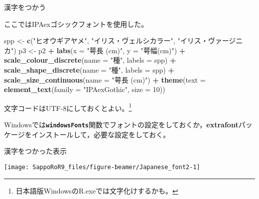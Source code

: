 \documentclass[ignorenonframetext,]{beamer}
\newenvironment{Shaded}{\begin{snugshade}}{\end{snugshade}}
\newcommand{\KeywordTok}[1]{\textcolor[rgb]{0.13,0.29,0.53}{\textbf{#1}}}
\newcommand{\DataTypeTok}[1]{\textcolor[rgb]{0.13,0.29,0.53}{#1}}
\newcommand{\DecValTok}[1]{\textcolor[rgb]{0.00,0.00,0.81}{#1}}
\newcommand{\StringTok}[1]{\textcolor[rgb]{0.31,0.60,0.02}{#1}}
\newcommand{\OperatorTok}[1]{\textcolor[rgb]{0.81,0.36,0.00}{\textbf{#1}}}
\newcommand{\NormalTok}[1]{#1}
\let\oldShaded\Shaded
\let\endoldShaded\endShaded
\renewenvironment{Shaded}{\footnotesize\oldShaded}{\endoldShaded}
\begin{document}
\begin{frame}[fragile]{漢字をつかう}

ここではIPAexゴシックフォントを使用した。

\begin{Shaded}
\begin{Highlighting}[]
\NormalTok{spp <-}\StringTok{ }\KeywordTok{c}\NormalTok{(}\StringTok{"ヒオウギアヤメ"}\NormalTok{, }\StringTok{"イリス・ヴェルシカラー"}\NormalTok{,}
         \StringTok{"イリス・ヴァージニカ"}\NormalTok{)}
\NormalTok{p3 <-}\StringTok{ }\NormalTok{p2 }\OperatorTok{+}\StringTok{ }\KeywordTok{labs}\NormalTok{(}\DataTypeTok{x =} \StringTok{"萼長 (cm)"}\NormalTok{, }\DataTypeTok{y =} \StringTok{"萼幅(cm)"}\NormalTok{) }\OperatorTok{+}
\StringTok{  }\KeywordTok{scale_colour_discrete}\NormalTok{(}\DataTypeTok{name =} \StringTok{"種"}\NormalTok{, }\DataTypeTok{labels =}\NormalTok{ spp) }\OperatorTok{+}
\StringTok{  }\KeywordTok{scale_shape_discrete}\NormalTok{(}\DataTypeTok{name =} \StringTok{"種"}\NormalTok{, }\DataTypeTok{labels =}\NormalTok{ spp) }\OperatorTok{+}
\StringTok{  }\KeywordTok{scale_size_continuous}\NormalTok{(}\DataTypeTok{name =} \StringTok{"萼長 (cm)"}\NormalTok{) }\OperatorTok{+}
\StringTok{  }\KeywordTok{theme}\NormalTok{(}\DataTypeTok{text =} \KeywordTok{element_text}\NormalTok{(}\DataTypeTok{family =} \StringTok{"IPAexGothic"}\NormalTok{, }\DataTypeTok{size =} \DecValTok{10}\NormalTok{))}
\end{Highlighting}
\end{Shaded}

文字コードはUTF-8にしておくとよい。\footnote{日本語版WindowsのR.exeでは文字化けするかも。}

Windowsでは\textbf{\texttt{windowsFonts}}関数でフォントの設定をしておくか，\textbf{extrafont}パッケージをインストールして，必要な設定をしておく。

\end{frame}

\begin{frame}{漢字をつかった表示}

\texttt{[image: SappoRoR9\_files/figure-beamer/Japanese\_font2-1]}

\end{frame}
\end{document}
